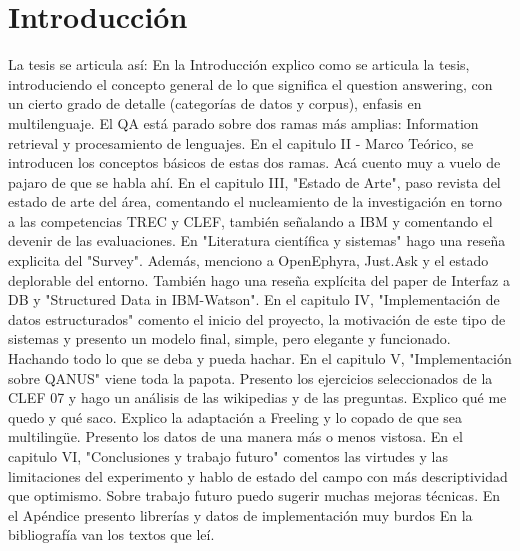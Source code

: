 
\chapter{Introducción}
La tesis se articula así: En la Introducción explico como se articula la tesis, introduciendo el concepto general de lo que significa el question answering, con un cierto grado de detalle (categorías de datos y corpus), enfasis en multilenguaje. 
El QA está parado sobre dos ramas más amplias: Information retrieval y procesamiento de lenguajes. En el capitulo II - Marco Teórico, se introducen los conceptos básicos de estas dos ramas. Acá cuento muy a vuelo de pajaro de que se habla ahí.
En el capitulo III, "Estado de Arte", paso revista del estado de arte del área, comentando el nucleamiento de la investigación en torno a las competencias TREC y CLEF, también señalando a IBM y comentando el devenir de las evaluaciones. En "Literatura científica y sistemas" hago una reseña explicita del "Survey". Además, menciono a OpenEphyra, Just.Ask y el estado deplorable del entorno. También hago una reseña explícita del paper de Interfaz a DB y "Structured Data in IBM-Watson". 
En el capitulo IV, "Implementación de datos estructurados" comento el inicio del proyecto, la motivación de este tipo de sistemas y presento un modelo final, simple, pero elegante y funcionado. Hachando todo lo que se deba y pueda hachar. 
En el capitulo V, "Implementación sobre QANUS" viene toda la papota. Presento los ejercicios seleccionados de la CLEF 07 y hago un análisis de las wikipedias y de las preguntas. Explico qué me quedo y qué saco. Explico la adaptación a Freeling y lo copado de que sea multilingüe. Presento los datos de una manera más o menos vistosa.
En el capitulo VI, "Conclusiones y trabajo futuro" comentos las virtudes y las limitaciones del experimento y hablo de estado del campo con más descriptividad que optimismo. Sobre trabajo futuro puedo sugerir muchas mejoras técnicas. 
En el Apéndice presento librerías y datos de implementación muy burdos
En la bibliografía van los textos que leí.



